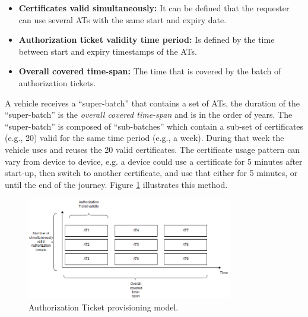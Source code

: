 \begin{itemize}
	\item{ \textbf{Certificates valid simultaneously:} It can be defined that the requester can use several ATs with the same start and expiry date.} 
	\item{ \textbf{Authorization ticket validity time period:} Is defined by the time between start and expiry timestamps of the ATs.}
	\item{ \textbf{Overall covered time-span:} The time that is covered by the batch of authorization tickets.}
\end{itemize}

A vehicle receives a ``super-batch'' that contains a set of ATs, the duration of the ``super-batch'' is the \textit{overall covered time-span} and is in the order of years. The ``super-batch'' is composed of ``sub-batches'' which contain a sub-set of certificates (e.g., 20) valid for the same time period (e.g., a week). During that week the vehicle uses and reuses the 20 valid certificates. The certificate usage pattern can vary from device to device, e.g. a device could use a certificate for 5 minutes after start-up, then switch to another certificate, and use that either for 5 minutes, or until the end of the journey. Figure \ref{fig:AT_P} illustrates this method. 

\begin{figure}
	\centering
	\includegraphics[width=0.8\textwidth]{Figures/AT_P.png}
	\caption{\label{fig:AT_P}Authorization Ticket provisioning model.}
\end{figure}

